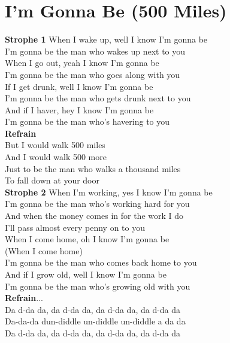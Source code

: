 \documentclass[twoside,8pt]{scrartcl}
\begin{document}
\section{I'm Gonna Be (500 Miles)}
\textbf{Strophe 1}\newline
When I wake up, well I know I'm gonna be\\
I'm gonna be the man who wakes up next to you\\
When I go out, yeah I know I'm gonna be\\
I'm gonna be the man who goes along with you\\
If I get drunk, well I know I'm gonna be\\
I'm gonna be the man who gets drunk next to you\\
And if I haver, hey I know I'm gonna be\\
I'm gonna be the man who's havering to you\\
\newline
\textbf{Refrain}\\
But I would walk 500 miles\\
And I would walk 500 more\\
Just to be the man who walks a thousand miles\\
To fall down at your door\\
\newline
\textbf{Strophe 2}\newline
When I'm working, yes I know I'm gonna be\\
I'm gonna be the man who's working hard for you\\
And when the money comes in for the work I do\\
I'll pass almost every penny on to you\\
When I come home, oh I know I'm gonna be\\
(When I come home)\\
I'm gonna be the man who comes back home to you\\
And if I grow old, well I know I'm gonna be\\
I'm gonna be the man who's growing old with you\\
\newline
\textbf{Refrain}...\\
\newline
Da d-da da, da d-da da, da d-da da, da d-da da\\
Da-da-da dun-diddle un-diddle un-diddle a da da\\
Da d-da da, da d-da da, da d-da da, da d-da da\\
\end{document}
